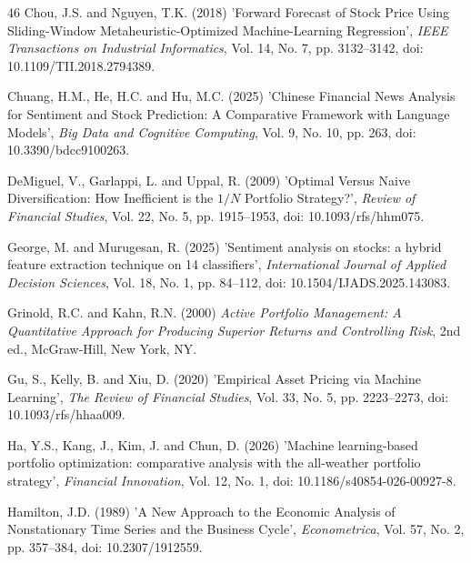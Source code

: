 \begin{thebibliography}{46}
Chou, J.S. and Nguyen, T.K. (2018) 'Forward Forecast of Stock Price Using Sliding-Window Metaheuristic-Optimized Machine-Learning Regression', {\it IEEE Transactions on Industrial Informatics}, Vol. 14, No. 7, pp. 3132--3142, doi: 10.1109/TII.2018.2794389.

Chuang, H.M., He, H.C. and Hu, M.C. (2025) 'Chinese Financial News Analysis for Sentiment and Stock Prediction: A Comparative Framework with Language Models', {\it Big Data and Cognitive Computing}, Vol. 9, No. 10, pp. 263, doi: 10.3390/bdcc9100263.

DeMiguel, V., Garlappi, L. and Uppal, R. (2009) 'Optimal Versus Naive Diversification: How Inefficient is the $1/N$ Portfolio Strategy?', {\it Review of Financial Studies}, Vol. 22, No. 5, pp. 1915--1953, doi: 10.1093/rfs/hhm075.

George, M. and Murugesan, R. (2025) 'Sentiment analysis on stocks: a hybrid feature extraction technique on 14 classifiers', {\it International Journal of Applied Decision Sciences}, Vol. 18, No. 1, pp. 84--112, doi: 10.1504/IJADS.2025.143083.

Grinold, R.C. and Kahn, R.N. (2000) {\it Active Portfolio Management: A Quantitative Approach for Producing Superior Returns and Controlling Risk}, 2nd ed., McGraw-Hill, New York, NY.

Gu, S., Kelly, B. and Xiu, D. (2020) 'Empirical Asset Pricing via Machine Learning', {\it The Review of Financial Studies}, Vol. 33, No. 5, pp. 2223--2273, doi: 10.1093/rfs/hhaa009.

Ha, Y.S., Kang, J., Kim, J. and Chun, D. (2026) 'Machine learning-based portfolio optimization: comparative analysis with the all-weather portfolio strategy', {\it Financial Innovation}, Vol. 12, No. 1, doi: 10.1186/s40854-026-00927-8.

Hamilton, J.D. (1989) 'A New Approach to the Economic Analysis of Nonstationary Time Series and the Business Cycle', {\it Econometrica}, Vol. 57, No. 2, pp. 357--384, doi: 10.2307/1912559.


\end{thebibliography}
